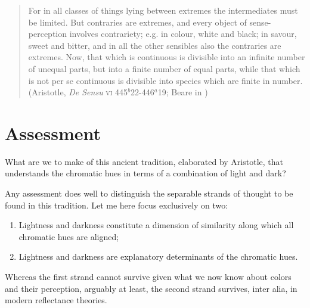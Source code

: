 \begin{quote}
	For in all classes of things lying between extremes the intermediates must be limited. But contraries are extremes, and every object of sense-perception involves contrariety; e.g. in colour, white and black; in savour, sweet and bitter, and in all the other sensibles also the contraries are extremes. Now, that which is continuous is divisible into an infinite number of unequal parts, but into a finite number of equal parts, while that which is not per se continuous is divisible into species which are finite in number. (Aristotle, \emph{De Sensu} \textsc{vi} 445\( ^{b} \)22-446\( ^{a} \)19; Beare in \citealt[18]{Barnes:1984uq})
\end{quote}


\section{Assessment} %
\label{sec:assessment}

What are we to make of this ancient tradition, elaborated by Aristotle, that understands the chromatic hues in terms of a combination of light and dark?

Any assessment does well to distinguish the separable strands of thought to be found in this tradition. Let me here focus exclusively on two:
\begin{enumerate}[(1)]
	\item Lightness and darkness constitute a dimension of similarity along which all chromatic hues are aligned;
	\item Lightness and darkness are explanatory determinants of the chromatic hues.
\end{enumerate}
Whereas the first strand cannot survive given what we now know about colors and their perception, arguably at least, the second strand survives, inter alia, in modern reflectance theories.

